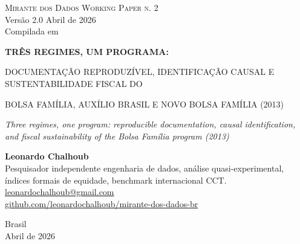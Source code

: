 \documentclass[12pt,a4paper,oneside]{article}
\begin{document}
\begin{titlepage}
  \begin{center}
    \vspace*{1.5cm}
    {\small\textsc{Mirante dos Dados \quad\textbar\quad Working Paper n. 2}}\\
    {\small Versão 2.0 \textemdash{} Abril de 2026}\\[2pt]
    {\footnotesize Compilada em \COMPILESTAMP\ \textbullet\ \texttt{\COMPILESHA}}

    \vfill

    {\LARGE\bfseries
     TRÊS REGIMES, UM PROGRAMA:

     DOCUMENTAÇÃO REPRODUZÍVEL,
     IDENTIFICAÇÃO CAUSAL E
     SUSTENTABILIDADE FISCAL DO

     BOLSA FAMÍLIA, AUXÍLIO BRASIL E
     NOVO BOLSA FAMÍLIA (2013)}

    \vspace{1cm}
    {\large\itshape
     Three regimes, one program: reproducible documentation, causal
     identification, and fiscal sustainability of the Bolsa Família
     program (2013)}

    \vfill

    {\large\textbf{Leonardo Chalhoub}}\\[4pt]
    {\small Pesquisador independente \textemdash{} engenharia de dados,
     análise quasi-experimental, índices formais de equidade,
     benchmark internacional CCT.}\\[2pt]
    {\small\href{mailto:leonardochalhoub@gmail.com}{leonardochalhoub@gmail.com}}\\
    {\small\href{https://github.com/leonardochalhoub/mirante-dos-dados-br}{github.com/leonardochalhoub/mirante-dos-dados-br}}

    \vfill

    {\small Brasil \\ Abril de 2026}
  \end{center}
\end{titlepage}

\end{document}
